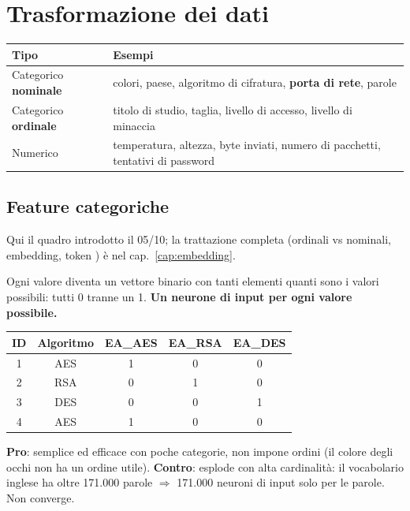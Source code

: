 \section{Trasformazione dei dati}
\begin{center}
\small
\begin{tabularx}{\textwidth}{l X}
\toprule
\textbf{Tipo} & \textbf{Esempi}\\
\midrule
Categorico \textbf{nominale} & colori, paese, algoritmo di cifratura, \textbf{porta di rete}, parole\\
Categorico \textbf{ordinale} & titolo di studio, taglia, livello di accesso, livello di minaccia\\
Numerico & temperatura, altezza, byte inviati, numero di pacchetti, tentativi di password\\
\bottomrule
\end{tabularx}
\end{center}

\subsection{Feature categoriche}
Qui il quadro introdotto il 05/10; la trattazione completa (ordinali vs nominali, embedding, token ) è nel
cap.~\ref{cap:embedding}.
\begin{definizione}
Ogni valore diventa un vettore binario con tanti elementi quanti sono i valori possibili: tutti 0 tranne un 1.
\textbf{Un neurone di input per ogni valore possibile.}
\end{definizione}
\begin{center}
\small
\begin{tabular}{cc|ccc}
\toprule
ID & Algoritmo & EA\_AES & EA\_RSA & EA\_DES\\
\midrule
1 & AES & 1 & 0 & 0\\
2 & RSA & 0 & 1 & 0\\
3 & DES & 0 & 0 & 1\\
4 & AES & 1 & 0 & 0\\
\bottomrule
\end{tabular}
\end{center}
\textbf{Pro}: semplice ed efficace con poche categorie, non impone ordini (il colore degli occhi non ha un ordine utile).
\textbf{Contro}: esplode con alta cardinalità: il vocabolario inglese ha oltre 171.000 parole $\Rightarrow$ 171.000 neuroni
di input solo per le parole. Non converge.

